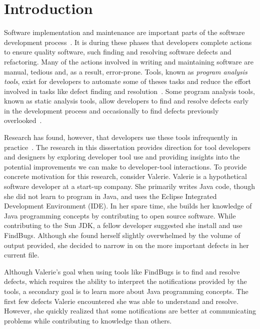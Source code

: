 \chapter{Introduction}
\label{chap-one}

Software implementation and maintenance are important parts of the software development process~\cite{krishnan2000empirical}. It is during these phases that developers complete actions to ensure quality software, such finding and resolving software defects and refactoring.
Many of the actions involved in writing and maintaining software are manual, tedious and, as a result, error-prone.
Tools, known as \textit{program analysis tools}, exist for developers to automate some of theses tasks and reduce the effort involved in tasks like defect finding and resolution~\cite{bruckhaus1996impact}. 
Some program analysis tools, known as static analysis tools, allow developers to find and resolve defects early in the development process and occasionally to find defects previously overlooked~\cite{ayewah2010google,Ayewah:2008:FindBugs}.

Research has found, however, that developers use these tools infrequently in practice~\cite{Ayewah:2008:FindBugs, ge2012reconciling, smith2015questions}. The research in this dissertation provides direction for tool developers and designers by exploring developer tool use and providing insights into the potential improvements we can make to developer-tool interactions.
To provide concrete motivation for this research, consider Valerie. Valerie is a hypothetical software developer at a start-up company. She primarily writes Java code, though she did not learn to program in Java, and uses the Eclipse Integrated Development Environment (IDE). In her spare time, she builds her knowledge of Java programming concepts by contributing to open source software. While contributing to the Sun JDK, a fellow developer suggested she install and use FindBugs. Although she found herself slightly overwhelmed by the volume of output provided, she decided to narrow in on the more important defects in her current file.

Although Valerie's goal when using tools like FindBugs is to find and resolve defects, which requires the ability to interpret the notifications provided by the tools, a secondary goal is to learn more about Java programming concepts. 
The first few defects Valerie encountered she was able to understand and resolve. However, she quickly realized that some notifications are better at communicating problems while contributing to knowledge than others. 

